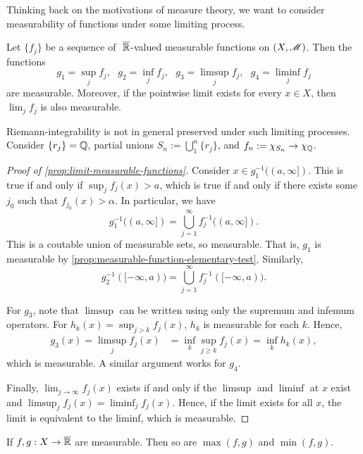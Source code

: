\documentclass[12pt]{article} %
\begin{document}
Thinking back on the motivations of measure theory, we want to consider measurability of functions under some limiting process. 

\begin{proposition}\label{prop:limit-measurable-functions}
    Let $\{f_j\}$ be a sequence of $\ \overline{\mathbb{R}}$-valued measurable functions on $(X, \mathscr{M})$. Then the functions \[g_1 = \sup_j f_j, \ \ \ g_2 = \inf_j f_j, \ \ \ g_3 = \limsup_j f_j, \ \ \ g_4 = \liminf_j f_j\] are measurable. Moreover, if the pointwise limit exists for every $x \in X$, then $\lim_j f_j$ is also measurable.
\end{proposition}

\begin{remark}
    Riemann-integrability is not in general preserved under such limiting processes. Consider $\{r_j\} = \mathbb{Q}$, partial unions $S_n := \bigcup_1^n \{r_j\}$, and $f_n := \chi_{S_n} \to \chi_{\mathbb{Q}}$.
\end{remark}

\begin{proof}[Proof of \cref{prop:limit-measurable-functions}]
    Consider $x \in g_1^{-1}((a, \infty])$. This is true if and only if $\sup_j f_j(x) > a$, which is true if and only if there exists some $j_0$ such that $f_{j_0}(x) > \alpha$. In particular, we have \[g_1^{-1}((a, \infty]) = \bigcup_{j=1}^{\infty} f_j^{-1}((a, \infty]).\] This is a coutable union of measurable sets, so measurable. That is, $g_1$ is measurable by \cref{prop:measurable-function-elementary-test}. Similarly, \[g_2^{-1}([-\infty, a)) = \bigcup_{j=1}^{\infty} f_j^{-1}([-\infty, a)).\]

    For $g_3$, note that $\limsup$ can be written using only the supremum and infemum operators. For $h_k(x) = \sup_{j > k} f_j(x)$, $h_k$ is measurable for each $k$. Hence, \begin{align*}
        g_3(x) = \limsup_{j} f_j(x) &= \inf_k \sup_{j \geq k} f_j(x) = \inf_k h_k(x),
    \end{align*} which is measurable. A similar argument works for $g_4$.

    Finally, $\lim_{j \to \infty} f_j(x)$ exists if and only if the $\limsup$ and $\liminf$ at $x$ exist and $\limsup_j f_j(x) = \liminf_j f_j(x)$. Hence, if the limit exists for all $x$, the limit is equivalent to the liminf, which is measurable.
\end{proof}

\begin{corollary}
    If $f, g : X \to \overline{\mathbb{R}}$ are measurable. Then so are $\max(f, g)$ and $\min(f, g)$.
\end{corollary}
\end{document}
